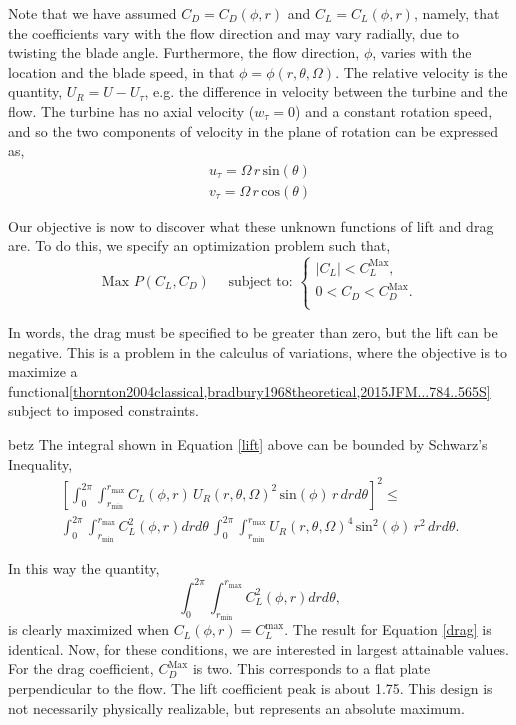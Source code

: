 Note that we have assumed $C_D = C_D(\phi,r)$ and $C_L = C_L(\phi,r)$,
namely, that the coefficients vary with the flow direction and may vary
radially, due to twisting the blade angle. Furthermore, the flow
direction, $\phi$, varies with the location and the blade speed,
in that $\phi=\phi(r,\theta,\Omega)$. The relative velocity is the
quantity, $U_R = U - U_\tau$, e.g. the difference in velocity between
the turbine and the flow. The turbine has no axial velocity ($w_\tau =
0$) and a constant rotation speed, and so the two components of velocity
in the plane of rotation can be expressed as,
\begin{align}
 u_\tau = \Omega \,r\, \text{sin}(\theta)\\
 v_\tau = \Omega \,r\, \text{cos}(\theta)
\end{align}

Our objective is now to discover what these unknown functions of lift
and drag are. To do this, we specify an optimization problem such that, 
\begin{equation*} 
 \text{Max } P(C_L,C_D) \quad \text{ subject to: }
  \begin{cases}
   |C_L| < C_L^{\text{Max}}, \\
   0 < C_D < C_D^{\text{Max}}. \\
  \end{cases}
\end{equation*}

In words, the drag must be specified to be greater than zero, but
the lift can be negative. This is a problem in the calculus of
variations, where the objective is to maximize a
functional\ref{thornton2004classical,bradbury1968theoretical,2015JFM...784..565S}
subject to imposed constraints. 

%
betz%
The integral shown in Equation \ref{lift} above can be bounded by 
Schwarz's Inequality,  
\begin{align*}
  \left[
    \int_0^{2\pi}
    \int_{r_{\text{min}}}^{r_{\text{max}}} C_L(\phi,r)\, U_R(r,\theta,\Omega)^2
 \,\text{sin}(\phi)\, r\,dr d\theta \right]^2 \le \\
  \int_0^{2\pi} \int_{r_{\text{min}}}^{r_{\text{max}}} C_L^2(\phi,r) dr d\theta\,
  \int_0^{2\pi} \int_{r_{\text{min}}}^{r_{\text{max}}} U_R(r,\theta,\Omega)^4 
 \,\text{sin}^2(\phi)\, r^2\,dr d\theta.
\end{align*}

In this way the quantity,
\begin{equation}
  \int_0^{2\pi}
 \int_{r_{\text{min}}}^{r_{\text{max}}} C_L^2(\phi,r) dr d\theta, 
\end{equation}
is clearly maximized when $C_L(\phi,r) = C_L^{\text{max}}$. 
The result for Equation \ref{drag} is identical. Now, for these
conditions, we are interested in largest attainable values. For the drag
coefficient, $C_D^{\text{Max}}$ is two. %
This corresponds to a flat plate perpendicular to the flow.
The lift coefficient peak is about 1.75. This design is not necessarily
physically realizable, but represents an absolute maximum. 

